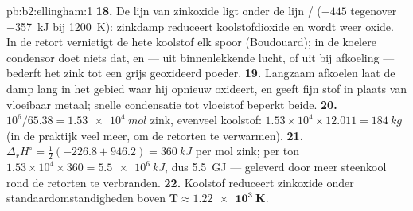\begin{solution}{pb:b2:ellingham:1}
\textbf{18.} De lijn van zinkoxide ligt onder de lijn /
($-445$ tegenover \qty{-357}{kJ} bij \qty{1200}{K}): zinkdamp reduceert koolstofdioxide
en wordt weer oxide. In de retort vernietigt de hete koolstof elk spoor
 (Boudouard); in de koelere condensor doet niets dat, en  --- uit
binnenlekkende lucht, of uit  bij afkoeling --- bederft het zink tot een
grijs geoxideerd poeder.
\textbf{19.} Langzaam afkoelen laat de damp lang in het gebied waar hij
opnieuw oxideert, en geeft fijn stof in plaats van vloeibaar metaal; snelle
condensatie tot vloeistof beperkt beide.
\textbf{20.} $10^6/65.38 = \qty{1.53e4}{mol}$ zink, evenveel koolstof:
$1.53 \times 10^4 \times 12.011 = \qty{184}{kg}$ (in de praktijk veel meer, om de
retorten te verwarmen).
\textbf{21.} $\Delta_r H^\circ = \frac12(-226.8 + 946.2) = \qty{+360}{kJ}$ per
mol zink; per ton $1.53 \times 10^4 \times 360 = \qty{5.5e6}{kJ}$, dus
\qty{5.5}{GJ} --- geleverd door meer steenkool rond de retorten te verbranden.
\textbf{22.} Koolstof reduceert zinkoxide onder standaardomstandigheden boven
$\boldsymbol{T \approx \qty{1.22e3}{K}}$.
\end{solution}
